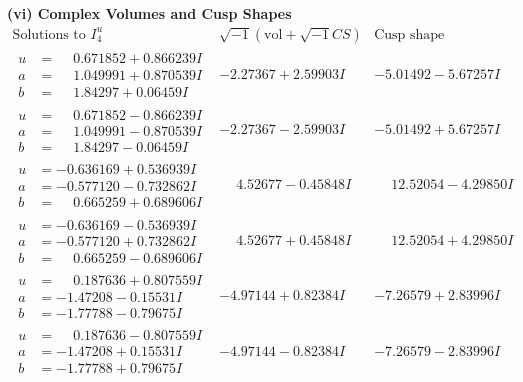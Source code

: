 \documentclass[1p]{elsarticle_modified}
\theoremstyle{definition}
\newcommand{\I}{\sqrt{-1}}
\begin{document}
\newpage\flushleft \textbf{(vi) Complex Volumes and Cusp Shapes}
$$\begin{array}{c|c|c}  
\text{Solutions to }I^u_{4}& \I (\text{vol} + \sqrt{-1}CS) & \text{Cusp shape}\\
 \hline 
\begin{aligned}
u &= \phantom{-}0.671852 + 0.866239 I \\
a &= \phantom{-}1.049991 + 0.870539 I \\
b &= \phantom{-}1.84297 + 0.06459 I\end{aligned}
 & -2.27367 + 2.59903 I & -5.01492 - 5.67257 I \\ \hline\begin{aligned}
u &= \phantom{-}0.671852 - 0.866239 I \\
a &= \phantom{-}1.049991 - 0.870539 I \\
b &= \phantom{-}1.84297 - 0.06459 I\end{aligned}
 & -2.27367 - 2.59903 I & -5.01492 + 5.67257 I \\ \hline\begin{aligned}
u &= -0.636169 + 0.536939 I \\
a &= -0.577120 - 0.732862 I \\
b &= \phantom{-}0.665259 + 0.689606 I\end{aligned}
 & \phantom{-}4.52677 - 0.45848 I & \phantom{-}12.52054 - 4.29850 I \\ \hline\begin{aligned}
u &= -0.636169 - 0.536939 I \\
a &= -0.577120 + 0.732862 I \\
b &= \phantom{-}0.665259 - 0.689606 I\end{aligned}
 & \phantom{-}4.52677 + 0.45848 I & \phantom{-}12.52054 + 4.29850 I \\ \hline\begin{aligned}
u &= \phantom{-}0.187636 + 0.807559 I \\
a &= -1.47208 - 0.15531 I \\
b &= -1.77788 - 0.79675 I\end{aligned}
 & -4.97144 + 0.82384 I & -7.26579 + 2.83996 I \\ \hline\begin{aligned}
u &= \phantom{-}0.187636 - 0.807559 I \\
a &= -1.47208 + 0.15531 I \\
b &= -1.77788 + 0.79675 I\end{aligned}
 & -4.97144 - 0.82384 I & -7.26579 - 2.83996 I \\ \hline\begin{aligned}

\end{aligned}
\end{array}$$
\end{document}
